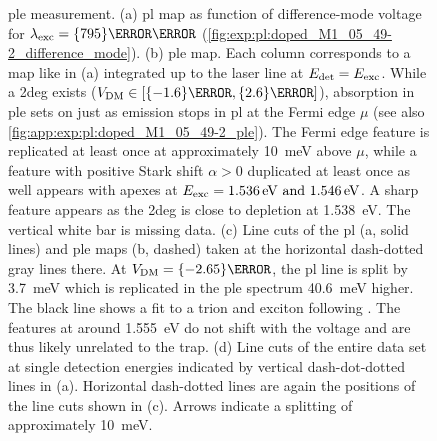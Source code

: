 \begin{figure}[H]
    \caption[
        \protect\newline
    ]{
        \Acrlong{ple} measurement.
        (a) \gls{pl} map as function of difference-mode voltage for $\lambda_{\mr{exc}} = \qty{795}{\nano\meter}$ (\cf \cref{fig:exp:pl:doped_M1_05_49-2_difference_mode}).
        (b) \gls{ple} map.
        Each column corresponds to a map like in (a) integrated up to the laser line at $E_{\mathrm{det}} = E_{\mathrm{exc}}$.
        While a \gls{2deg} exists ($\VDM\in[\qty{-1.6}{\volt}, \qty{2.6}{\volt}]$), absorption in \gls{ple} sets on just as emission stops in \gls{pl} at the Fermi edge $\mu$ (see also \cref{fig:app:exp:pl:doped_M1_05_49-2_ple}).
        The Fermi edge feature is replicated at least once at approximately \qty{10}{\milli\electronvolt} above $\mu$, while a feature with positive Stark shift $\alpha>0$ duplicated at least once as well appears with apexes at $E_{\mr{exc}} = \qtylist{1.536;1.546}{\electronvolt}$.
        A sharp feature appears as the \gls{2deg} is close to depletion at \qty{1.538}{\electronvolt}.
        The vertical white bar is missing data.
        (c) Line cuts of the \gls{pl} (a, solid lines) and \gls{ple} maps (b, dashed) taken at the horizontal dash-dotted gray lines there.
        At $\VDM = \qty{-2.65}{\volt}$, the \gls{pl} line is split by \qty{3.7}{\milli\electronvolt} which is replicated in the \gls{ple} spectrum \qty{40.6}{\milli\electronvolt} higher.
        The black line shows a fit to a trion and exciton following .
        The features at around \qty{1.555}{\electronvolt} do not shift with the voltage and are thus likely unrelated to the trap.
        (d) Line cuts of the entire data set at single detection energies indicated by vertical dash-dot-dotted lines in (a).
        Horizontal dash-dotted lines are again the positions of the line cuts shown in (c).
        Arrows indicate a splitting of approximately \qty{10}{\milli\electronvolt}.
    }
    \label{fig:exp:pl:doped_M1_05_49-2_ple}
\end{figure}

